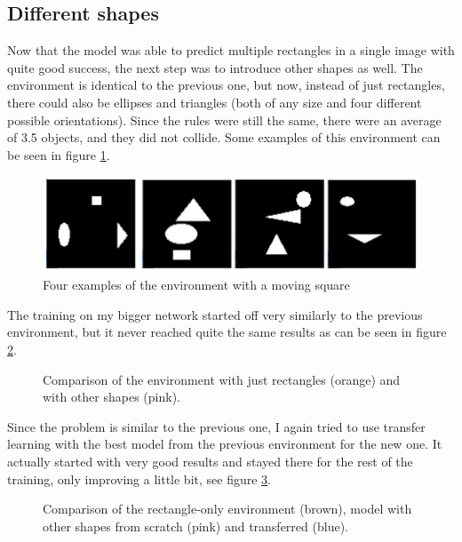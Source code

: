 \documentclass[
  digital,     %
  oneside,     %
  nosansbold,  %
  nocolorbold, %
  lof,         %
  lot,         %
]{fithesis4}
\begin{document}
\subsection{Different shapes}
Now that the model was able to predict multiple rectangles in a single image with quite good success, the next step was to introduce other shapes as well. The environment is identical to the previous one, but now, instead of just rectangles, there could also be ellipses and triangles (both of any size and four different possible orientations). Since the rules were still the same, there were an average of 3.5 objects, and they did not collide. Some examples of this environment can be seen in figure \ref{fig:env4}.

\begin{figure}
    \includegraphics[width=1\linewidth]{env_examples/env4.png}
    \caption{Four examples of the environment with a moving square}
    \label{fig:env4}
\end{figure}
 
The training on my bigger network started off very similarly to the previous environment, but it never reached quite the same results as can be seen in figure \ref{fig:v4_bigger_net}.

\begin{figure}
    \centering
    \makebox[\textwidth][c]{}
    \caption{Comparison of the environment with just rectangles (orange) and with other shapes (pink).}
    \label{fig:v4_bigger_net}
\end{figure}

Since the problem is similar to the previous one, I again tried to use transfer learning with the best model from the previous environment for the new one. It actually started with very good results and stayed there for the rest of the training, only improving a little bit, see figure \ref{fig:v4_transfer}.

\begin{figure}
    \centering
    \makebox[\textwidth][c]{}
    \caption{Comparison of the rectangle-only environment (brown), model with other shapes from scratch (pink) and transferred (blue).}
    \label{fig:v4_transfer}
\end{figure}
\end{document}
